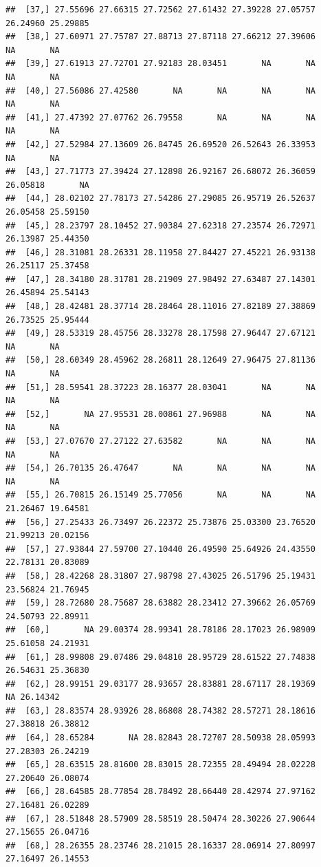 \documentclass{article}\usepackage[]{graphicx}\usepackage[]{color}
\makeatletter
\newenvironment{kframe}{%
 \def\at@end@of@kframe{}%
 \ifinner\ifhmode%
  \def\at@end@of@kframe{\end{minipage}}%
  \begin{minipage}{\columnwidth}%
 \fi\fi%
 \def\FrameCommand##1{\hskip\@totalleftmargin \hskip-\fboxsep
 \colorbox{shadecolor}{##1}\hskip-\fboxsep
     \hskip-\linewidth \hskip-\@totalleftmargin \hskip\columnwidth}%
 \MakeFramed {\advance\hsize-\width
   \@totalleftmargin\z@ \linewidth\hsize
   \@setminipage}}%
 {\par\unskip\endMakeFramed%
 \at@end@of@kframe}
\newenvironment{knitrout}{}{} %
\makeatother
\begin{document}
\begin{knitrout}
\begin{kframe}
\begin{verbatim}
##  [37,] 27.55696 27.66315 27.72562 27.61432 27.39228 27.05757 26.24960 25.29885
##  [38,] 27.60971 27.75787 27.88713 27.87118 27.66212 27.39606       NA       NA
##  [39,] 27.61913 27.72701 27.92183 28.03451       NA       NA       NA       NA
##  [40,] 27.56086 27.42580       NA       NA       NA       NA       NA       NA
##  [41,] 27.47392 27.07762 26.79558       NA       NA       NA       NA       NA
##  [42,] 27.52984 27.13609 26.84745 26.69520 26.52643 26.33953       NA       NA
##  [43,] 27.71773 27.39424 27.12898 26.92167 26.68072 26.36059 26.05818       NA
##  [44,] 28.02102 27.78173 27.54286 27.29085 26.95719 26.52637 26.05458 25.59150
##  [45,] 28.23797 28.10452 27.90384 27.62318 27.23574 26.72971 26.13987 25.44350
##  [46,] 28.31081 28.26331 28.11958 27.84427 27.45221 26.93138 26.25117 25.37458
##  [47,] 28.34180 28.31781 28.21909 27.98492 27.63487 27.14301 26.45894 25.54143
##  [48,] 28.42481 28.37714 28.28464 28.11016 27.82189 27.38869 26.73525 25.95444
##  [49,] 28.53319 28.45756 28.33278 28.17598 27.96447 27.67121       NA       NA
##  [50,] 28.60349 28.45962 28.26811 28.12649 27.96475 27.81136       NA       NA
##  [51,] 28.59541 28.37223 28.16377 28.03041       NA       NA       NA       NA
##  [52,]       NA 27.95531 28.00861 27.96988       NA       NA       NA       NA
##  [53,] 27.07670 27.27122 27.63582       NA       NA       NA       NA       NA
##  [54,] 26.70135 26.47647       NA       NA       NA       NA       NA       NA
##  [55,] 26.70815 26.15149 25.77056       NA       NA       NA 21.26467 19.64581
##  [56,] 27.25433 26.73497 26.22372 25.73876 25.03300 23.76520 21.99213 20.02156
##  [57,] 27.93844 27.59700 27.10440 26.49590 25.64926 24.43550 22.78131 20.83089
##  [58,] 28.42268 28.31807 27.98798 27.43025 26.51796 25.19431 23.56824 21.76945
##  [59,] 28.72680 28.75687 28.63882 28.23412 27.39662 26.05769 24.50793 22.89911
##  [60,]       NA 29.00374 28.99341 28.78186 28.17023 26.98909 25.61058 24.21931
##  [61,] 28.99808 29.07486 29.04810 28.95729 28.61522 27.74838 26.54631 25.36830
##  [62,] 28.99151 29.03177 28.93657 28.83881 28.67117 28.19369       NA 26.14342
##  [63,] 28.83574 28.93926 28.86808 28.74382 28.57271 28.18616 27.38818 26.38812
##  [64,] 28.65284       NA 28.82843 28.72707 28.50938 28.05993 27.28303 26.24219
##  [65,] 28.63515 28.81600 28.83015 28.72355 28.49494 28.02228 27.20640 26.08074
##  [66,] 28.64585 28.77854 28.78492 28.66440 28.42974 27.97162 27.16481 26.02289
##  [67,] 28.51848 28.57909 28.58519 28.50474 28.30226 27.90644 27.15655 26.04716
##  [68,] 28.26355 28.23746 28.21015 28.16337 28.06914 27.80997 27.16497 26.14553

\end{verbatim}
\end{kframe}
\end{knitrout}
\end{document}

